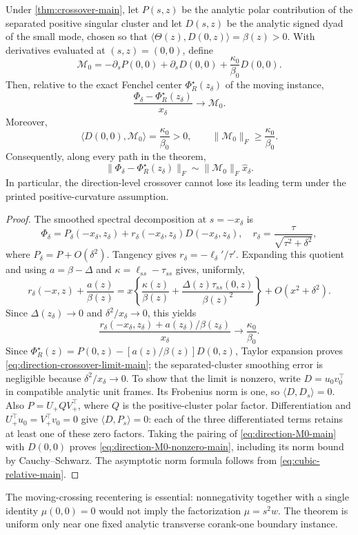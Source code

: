\begin{corollary}
\label{cor:direction-crossover-main}
Under \cref{thm:crossover-main}, let \(P(s,z)\) be the analytic polar
contribution of the separated positive singular cluster and let \(D(s,z)\) be
the analytic signed dyad of the small mode, chosen so that
\(\langle\Theta(z),D(0,z)\rangle=\beta(z)>0\).  With derivatives evaluated at
\((s,z)=(0,0)\), define
 \begin{equation}
 \mathcal M_0=-\partial_sP(0,0)+\partial_sD(0,0)
 +\frac{\kappa_0}{\beta_0}D(0,0).
 \label{eq:direction-M0-main}
\end{equation}
Then, relative to the exact Fenchel center \(\Phi_R^\star(z_\delta)\) of the
moving instance,
\begin{equation}
 \frac{\Phi_\delta-\Phi_R^\star(z_\delta)}{x_\delta}
 \longrightarrow\mathcal M_0.
 \label{eq:direction-crossover-limit-main}
\end{equation}
Moreover,
\begin{equation}
 \langle D(0,0),\mathcal M_0\rangle=\frac{\kappa_0}{\beta_0}>0,
 \qquad
 \|\mathcal M_0\|_F\ge\frac{\kappa_0}{\beta_0}.
 \label{eq:direction-M0-nonzero-main}
\end{equation}
Consequently, along every path in the theorem,
\[
 \|\Phi_\delta-\Phi_R^\star(z_\delta)\|_F
 \sim\|\mathcal M_0\|_F\widehat x_\delta.
\]
In particular, the direction-level crossover cannot lose its leading term
under the printed positive-curvature assumption.
\end{corollary}

\begin{proof}
The smoothed spectral decomposition at \(s=-x_\delta\) is
\[
 \Phi_\delta=P_\delta(-x_\delta,z_\delta)
 +r_\delta(-x_\delta,z_\delta)D(-x_\delta,z_\delta),
 \quad
 r_\delta=\frac{\tau}{\sqrt{\tau^2+\delta^2}},
\]
where \(P_\delta=P+O(\delta^2)\).  Tangency gives
\(r_\delta=-\ell_\delta'/\tau'\).  Expanding this quotient and using
\(a=\beta-\Delta\) and
\(\kappa=\ell_{ss}-\tau_{ss}\) gives, uniformly,
\[
 r_\delta(-x,z)+\frac{a(z)}{\beta(z)}
 =x\left\{\frac{\kappa(z)}{\beta(z)}
 +\frac{\Delta(z)\tau_{ss}(0,z)}{\beta(z)^2}\right\}
 +O(x^2+\delta^2).
\]
Since \(\Delta(z_\delta)\to0\) and \(\delta^2/x_\delta\to0\), this yields
\[
 \frac{r_\delta(-x_\delta,z_\delta)+a(z_\delta)/\beta(z_\delta)}
 {x_\delta}\longrightarrow\frac{\kappa_0}{\beta_0}.
\]
Since
\(\Phi_R^\star(z)=P(0,z)-[a(z)/\beta(z)]D(0,z)\), Taylor expansion proves
\eqref{eq:direction-crossover-limit-main}; the separated-cluster smoothing
error is negligible because \(\delta^2/x_\delta\to0\).
To show that the limit is nonzero, write \(D=u_0v_0^\top\) in compatible
analytic unit frames.  Its Frobenius norm is one, so
\(\langle D,D_s\rangle=0\).  Also
\(P=U_+Q V_+^\top\), where \(Q\) is the positive-cluster polar factor.
Differentiation and \(U_+^\top u_0=V_+^\top v_0=0\) give
\(\langle D,P_s\rangle=0\): each of the three differentiated terms
retains at least one of these zero factors.  Taking the pairing of
\eqref{eq:direction-M0-main} with \(D(0,0)\) proves
\eqref{eq:direction-M0-nonzero-main}, including its norm bound by
Cauchy--Schwarz.  The asymptotic norm formula follows from
\eqref{eq:cubic-relative-main}.
\end{proof}

The moving-crossing recentering is essential: nonnegativity together with a
single identity \(\mu(0,0)=0\) would not imply the factorization
\(\mu=s^2w\).  The theorem is uniform only near one fixed analytic transverse
corank-one boundary instance.
